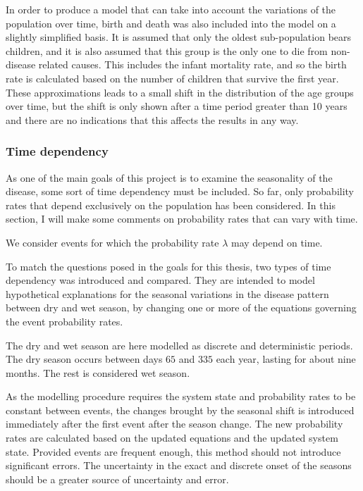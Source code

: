 \documentclass[10pt,a4paper]{article}
\begin{document}
In order to produce a model that can take into account the variations of the population over time, birth and death was also included into the model on a slightly simplified basis. It is assumed that only the oldest sub-population bears children, and it is also assumed that this group is the only one to die from non-disease related causes. This includes the infant mortality rate, and so the birth rate is calculated based on the number of children that survive the first year. These approximations leads to a small shift in the distribution of the age groups over time, but the shift is only shown after a time period greater than 10 years and there are no indications that this affects the results in any way.

\subsubsection{Time dependency}

As one of the main goals of this project is to examine the seasonality of the disease, some sort of time dependency must be included. So far, only probability rates that depend exclusively on the population has been considered. In this section, I will make some comments on probability rates that can vary with time.

We consider events for which the probability rate $\lambda$ may depend on time. 

To match the questions posed in the goals for this thesis, two types of time dependency was introduced and compared. They are intended to model hypothetical explanations for the seasonal variations in the disease pattern between dry and wet season, by changing one or more of the equations governing the event probability rates.

The dry and wet season are here modelled as discrete and deterministic periods. The dry season occurs between days $65$ and $335$ each year, lasting for about nine months. The rest is considered wet season.

As the modelling procedure requires the system state and probability rates to be constant between events, the changes brought by the seasonal shift is introduced immediately after the first event after the season change. The new probability rates are calculated based on the updated equations and the updated system state. Provided events are frequent enough, this method should not introduce significant errors. The uncertainty in the exact and discrete onset of the seasons should be a greater source of uncertainty and error.
\end{document}
